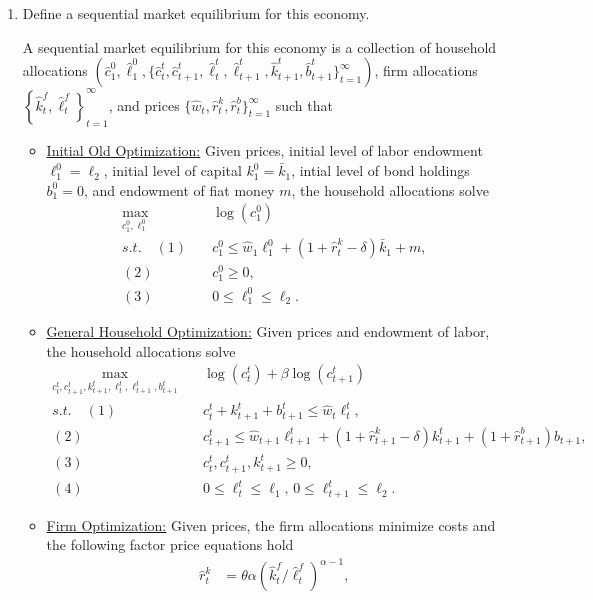 \documentclass[11pt,english]{article}
\begin{document}
\begin{enumerate}
    \item[a)] Define a sequential market equilibrium for this economy.
    \begin{solution}
 A sequential market equilibrium for this economy is a collection of household allocations $\left(\hat{c}_1^0, \hat{\ell}_1^0, \{\hat{c}_t^t, \hat{c}_{t+1}^t, \hat{\ell}_t^t, \hat{\ell}_{t+1}^t, \hat{k}_{t+1}^t, \hat{b}_{t+1}^t\}_{t=1}^\infty\right)$, firm allocations $\left\{\hat{k}_t^f, \hat{\ell}_t^f\right\}_{t = 1}^\infty$, and prices $\{\hat{w}_t, \hat{r}_t^k, \hat{r}_t^b\}_{t=1}^\infty$ such that
\begin{itemize}
\item \underline{Initial Old Optimization:} Given prices, initial level of labor endowment $\ell_1^0 = \ell_2$, initial level of capital $k_1^0 = \bar{k}_1$, intial level of bond holdings $b_1^0 = 0$, and endowment of fiat money $m$, the household allocations solve
\begin{align*}
\max_{c_1^0, \ell_1^0}&\quad \log(c_1^0)\\
s.t.\quad (1)&\quad c_1^0 \leq \hat{w}_1\ell_1^0 + (1 + \hat{r}_t^k - \delta)\bar{k}_1 + m,\\
(2)&\quad c_1^0 \geq 0,\\
(3)&\quad 0 \leq \ell_1^0 \leq \ell_2.
\end{align*}
\item \underline{General Household Optimization:} Given prices and endowment of labor, the household allocations solve
\begin{align*}
\max_{c_t^t, c_{t+1}^t, k_{t+1}^t, \ell_t^t, \ell_{t+1}^t, b_{t+1}^t}&\quad \log(c_t^t) + \beta \log(c_{t+1}^t)\\
s.t.\quad (1)&\quad c_t^t + k_{t+1}^t + b_{t+1}^t \leq \hat{w}_t \ell_t^t,\\
(2)&\quad c_{t+1}^t \leq \hat{w}_{t+1}\ell_{t+1}^t + (1 + \hat{r}_{t+1}^k - \delta)k_{t+1}^t + (1 + \hat{r}_{t+1}^b)b_{t+1},\\
(3)&\quad c_t^t, c_{t+1}^t, k_{t+1}^t \geq 0,\\
(4)&\quad 0 \leq \ell_t^t \leq \ell_1,\, 0 \leq \ell_{t+1}^t \leq \ell_2.
\end{align*}
\item \underline{Firm Optimization:} Given prices, the firm allocations minimize costs and the following factor price equations hold
\begin{align*}
\hat{r}_t^k &= \theta \alpha \left(\hat{k}_t^f / \hat{\ell}_t^f\right)^{\alpha - 1},\\

\end{align*}
\end{itemize}
\end{solution}
\end{enumerate}
\end{document}
